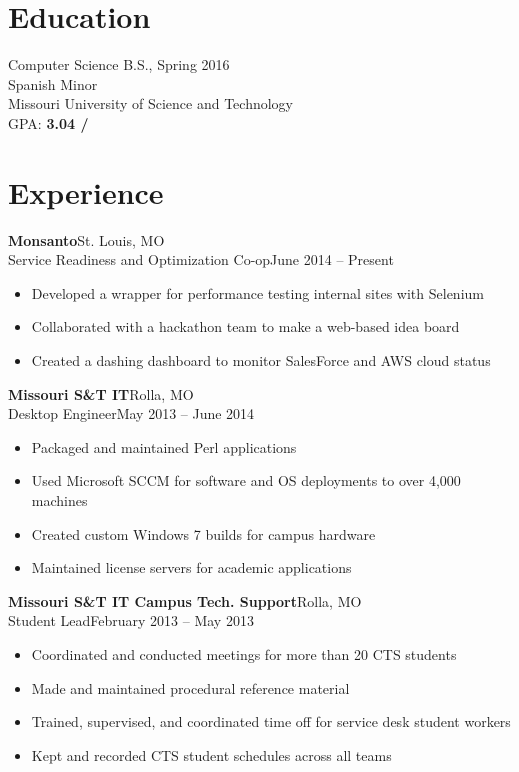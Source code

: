 \documentclass[margin]{res}
\begin{document}
  \begin{resume} 
   
    \section{Education} 
      Computer Science B.S., Spring 2016 \\
      Spanish Minor \\
      Missouri University of Science and Technology \\
      GPA: {\bf 3.04 \slash {}}

    \section{Experience}
       \textbf{Monsanto}\hfill St. Louis, MO\\
       Service Readiness and Optimization Co-op\hfill June 2014 -- Present
       \begin{itemize} \itemsep -1pt  %
         \item Developed a wrapper for performance testing internal sites with Selenium
         \item Collaborated with a hackathon team to make a web-based idea board 
         \item Created a dashing dashboard to monitor SalesForce and AWS cloud status
       \end{itemize}
       \textbf{Missouri S\&T IT}\hfill Rolla, MO\\
       Desktop Engineer\hfill May 2013 -- June 2014
       \begin{itemize} \itemsep -1pt  %
         \item Packaged and maintained Perl applications
         \item Used Microsoft SCCM for software and OS deployments to over 4,000 machines
         \item Created custom Windows 7 builds for campus hardware
         \item Maintained license servers for academic applications
       \end{itemize}

       \textbf{Missouri S\&T IT Campus Tech. Support}\hfill  Rolla, MO\\
       Student Lead\hfill February 2013 -- May 2013
       \begin{itemize} \itemsep -1pt  %
         \item Coordinated and conducted meetings for more than 20 CTS students
         \item Made and maintained procedural reference material
         \item Trained, supervised, and coordinated time off for service desk student workers
         \item Kept and recorded CTS student schedules across all teams
       \end{itemize}
     

\end{resume}
\end{document}
